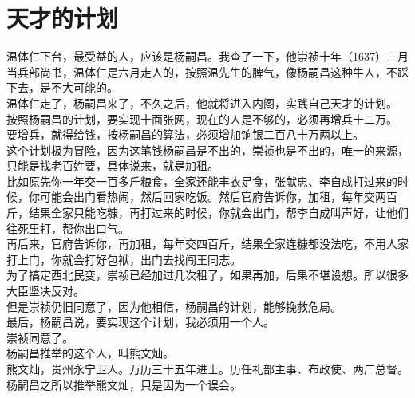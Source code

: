 \section{天才的计划}
\ifnum{}
	\begin{multicols}{\theparacolNo}
\fi
温体仁下台，最受益的人，应该是杨嗣昌。我查了一下，他崇祯十年（1637）三月当兵部尚书，温体仁是六月走人的，按照温先生的脾气，像杨嗣昌这种牛人，不踩下去，是不大可能的。\\

温体仁走了，杨嗣昌来了，不久之后，他就将进入内阁，实践自己天才的计划。\\

按照杨嗣昌的计划，要实现十面张网，现在的人是不够的，必须再增兵十二万。\\

要增兵，就得给钱，按杨嗣昌的算法，必须增加饷银二百八十万两以上。\\

这个计划极为冒险，因为这笔钱杨嗣昌是不出的，崇祯也是不出的，唯一的来源，只能是找老百姓要，具体说来，就是加租。\\

比如原先你一年交一百多斤粮食，全家还能丰衣足食，张献忠、李自成打过来的时候，你可能会出门看热闹，然后回家吃饭。然后官府告诉你，加租，每年交两百斤，结果全家只能吃糠，再打过来的时候，你就会出门，帮李自成叫声好，让他们往死里打，帮你出口气。\\

再后来，官府告诉你，再加租，每年交四百斤，结果全家连糠都没法吃，不用人家打上门，你就会打好包袱，出门去找闯王同志。\\

为了搞定西北民变，崇祯已经加过几次租了，如果再加，后果不堪设想。所以很多大臣坚决反对。\\

但是崇祯仍旧同意了，因为他相信，杨嗣昌的计划，能够挽救危局。\\

最后，杨嗣昌说，要实现这个计划，我必须用一个人。\\

崇祯同意了。\\

杨嗣昌推举的这个人，叫熊文灿。\\

熊文灿，贵州永宁卫人。万历三十五年进士。历任礼部主事、布政使、两广总督。\\

杨嗣昌之所以推举熊文灿，只是因为一个误会。\\


\end{multicols}

